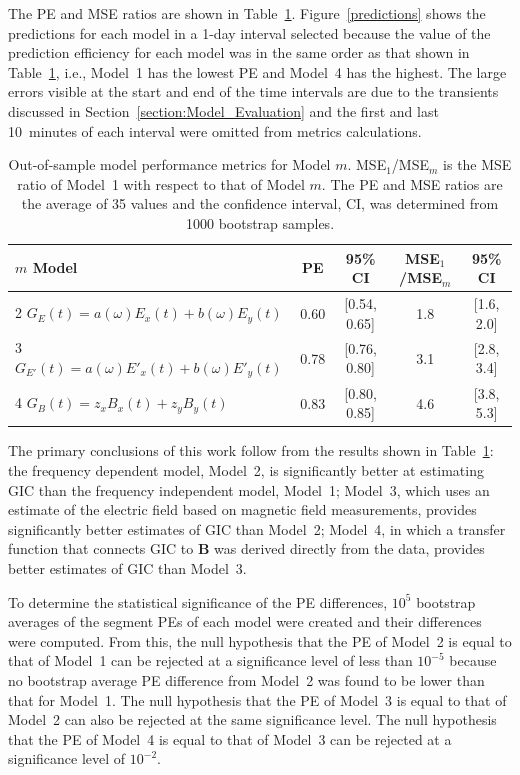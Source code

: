 \documentclass[draft,linenumbers]{agujournal2018}
\begin{document}
The PE and MSE ratios are shown in Table~\ref{resultstable}. Figure~\ref{predictions} shows the predictions for each model in a 1-day interval selected because the value of the prediction efficiency for each model was in the same order as that shown in Table~\ref{resultstable}, i.e., Model~1 has the lowest PE and Model~4 has the highest. The large errors visible at the start and end of the time intervals are due to the transients discussed in Section~\ref{section:Model_Evaluation} and the first and last 10~minutes of each interval were omitted from metrics calculations.

\begin{table}
  \caption{Out-of-sample model performance metrics for Model $m$. MSE$_1$/MSE$_m$ is the MSE ratio of Model~1 with respect to that of Model $m$. The PE and MSE ratios are the average of 35 values and the confidence interval, CI, was determined from 1000 bootstrap samples.}
  \centering
  \begin{tabular}{l c c c c}
    \hline
    $m$\hspace{1em} Model & PE & 95\% CI & MSE$_1$/MSE$_m$ & 95\% CI\\
    \hline
    2\hspace{1em} $G_E(t) = a(\omega)E_x(t) + b(\omega)E_y(t)$ & 0.60 & [0.54, 0.65] & 1.8 & [1.6, 2.0]\\
    3\hspace{1em} $G_{E'}(t) = a(\omega)E'_x(t) + b(\omega)E'_y(t)$ & 0.78 & [0.76, 0.80] & 3.1 & [2.8, 3.4]\\
    4\hspace{1em} $G_{B}(t) = z_xB_x(t) + z_yB_y(t)$ & 0.83 & [0.80, 0.85] & 4.6 & [3.8, 5.3]\\
    \hline
  \end{tabular}
  \label{resultstable}
\end{table}

The primary conclusions of this work follow from the results shown in Table~\ref{resultstable}: the frequency dependent model, Model~2, is significantly better at estimating GIC than the frequency independent model, Model~1; Model~3, which uses an estimate of the electric field based on magnetic field measurements, provides significantly better estimates of GIC than Model~2; Model~4, in which a transfer function that connects GIC to $\mathbf{B}$ was derived directly from the data, provides better estimates of GIC than Model~3.

To determine the statistical significance of the PE differences, $10^5$ bootstrap averages of the segment PEs of each model were created and their differences were computed. From this, the null hypothesis that the PE of Model~2 is equal to that of Model~1 can be rejected at a significance level of less than $10^{-5}$ because no bootstrap average PE difference from Model~2 was found to be lower than that for Model~1. The null hypothesis that the PE of Model~3 is equal to that of Model~2 can also be rejected at the same significance level. The null hypothesis that the PE of Model~4 is equal to that of Model~3 can be rejected at a significance level of $10^{-2}$.
\end{document}
